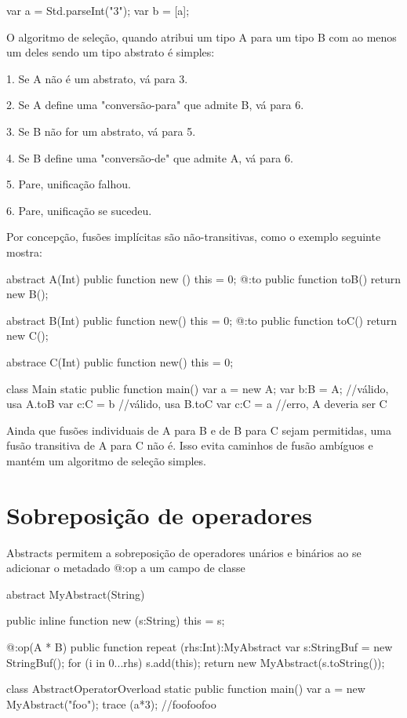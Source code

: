 {{{{{var a = Std.parseInt("3");
var b = [a];

O algoritmo de seleção, quando atribui um tipo A para um tipo B com ao menos um deles sendo um tipo abstrato é simples:

1. Se A não é um abstrato, vá para 3.

2. Se A define uma "conversão-para" que admite B, vá para 6.

3. Se B não for um abstrato, vá para 5.

4. Se B define uma "conversão-de" que admite A, vá para 6.

5. Pare, unificação falhou.

6. Pare, unificação se sucedeu.

  Por concepção, fusões implícitas são não-transitivas, como o exemplo seguinte mostra:

abstract A(Int) {
    public function new () this = 0;
    @:to public function toB() return new B();
}

abstract B(Int) {
    public function new() this = 0;
    @:to public function toC() return new C();
}

abstrace C(Int) {
    public function new() this = 0;
}

class Main {
    static public function main() {
        var a = new A;
        var b:B = A; //válido, usa A.toB
        var c:C = b  //válido, usa B.toC
        var c:C = a  //erro, A deveria ser C
    }
}

Ainda que fusões individuais de A para B e de B para C sejam permitidas, uma fusão transitiva de A para C não é. Isso evita caminhos de fusão ambíguos e mantém um algoritmo de seleção simples.

\section{Sobreposição de operadores}

Abstracts permitem a sobreposição de operadores unários e binários ao se adicionar  o metadado @:op a um campo de classe

abstract MyAbstract(String) {
   public inline function new (s:String) {
   this = s;
   }

    @:op(A * B)
    public function repeat (rhs:Int):MyAbstract {
        var s:StringBuf = new StringBuf();
        for (i in 0...rhs)
            s.add(this);
        return new MyAbstract(s.toString());
    }
}

class AbstractOperatorOverload {
    static public function main()
       var a = new MyAbstract("foo");
       trace (a*3); //foofoofoo
    }
}

}}}}

